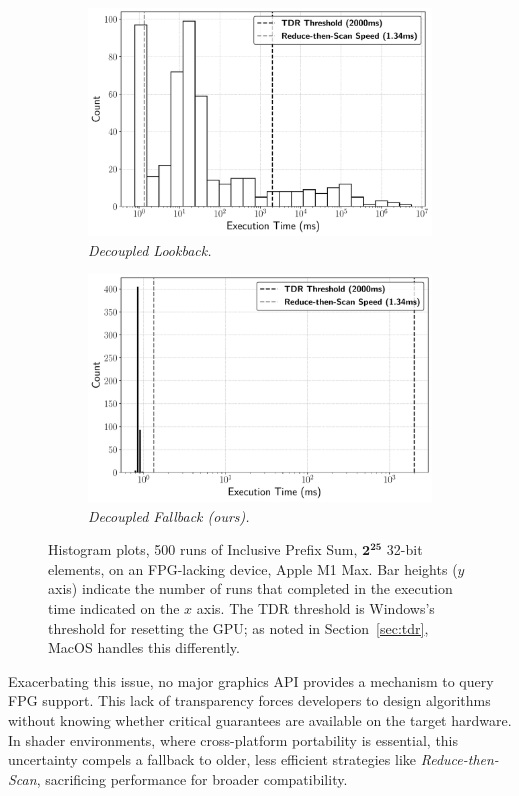 \documentclass[acmsmall, manuscript, screen, review, anonymous]{acmart}
\begin{document}
\begin{figure}
  \centering
  \begin{subfigure}[b]{0.45\linewidth}
    \includegraphics[width=\linewidth]{graphics/decoupled_lookback.pdf}
    \caption{\emph{Decoupled Lookback.}}
    \label{fig:decoupled}
  \end{subfigure}
  \hfill
  \begin{subfigure}[b]{0.45\linewidth}
    \includegraphics[width=\linewidth]{graphics/ours.pdf}
    \caption{\emph{Decoupled Fallback (ours).}}
    \label{fig:ours}
  \end{subfigure}
  \caption{Histogram plots, 500 runs of Inclusive Prefix Sum, $\mathbf{2^{25}}$ 32-bit elements, on an FPG-lacking device, Apple M1 Max. Bar heights ($y$ axis) indicate the number of runs that completed in the execution time indicated on the $x$ axis. The TDR threshold is Windows's threshold for resetting the GPU\@; as noted in Section~\ref{sec:tdr}, MacOS handles this differently.}
  \label{fig:dist}
\end{figure}
Exacerbating this issue, no major graphics API provides a mechanism to query FPG support. This lack of transparency forces developers to design algorithms without knowing whether critical guarantees are available on the target hardware. In shader environments, where cross-platform portability is essential, this uncertainty compels a fallback to older, less efficient strategies like \emph{Reduce-then-Scan}, sacrificing performance for broader compatibility.
\end{document}
